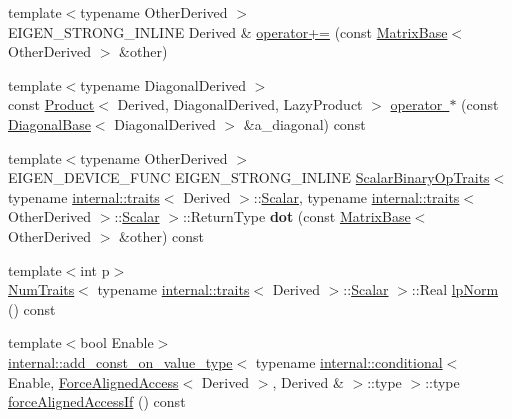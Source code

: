 \begin{DoxyCompactItemize}
\item 
{\footnotesize template$<$typename Other\+Derived $>$ }\\E\+I\+G\+E\+N\+\_\+\+S\+T\+R\+O\+N\+G\+\_\+\+I\+N\+L\+I\+NE Derived \& \mbox{\hyperlink{class_eigen_1_1_matrix_base_a8566b0baaa4cccebbfac4afcc994dc99}{operator+=}} (const \mbox{\hyperlink{class_eigen_1_1_matrix_base}{Matrix\+Base}}$<$ Other\+Derived $>$ \&other)
\item 
{\footnotesize template$<$typename Diagonal\+Derived $>$ }\\const \mbox{\hyperlink{class_eigen_1_1_product}{Product}}$<$ Derived, Diagonal\+Derived, Lazy\+Product $>$ \mbox{\hyperlink{class_eigen_1_1_matrix_base_a0268033122944d28a71ffc9da2a34304}{operator $\ast$}} (const \mbox{\hyperlink{class_eigen_1_1_diagonal_base}{Diagonal\+Base}}$<$ Diagonal\+Derived $>$ \&a\+\_\+diagonal) const
\item 
\mbox{\label{class_eigen_1_1_matrix_base_a30452bde1c49f11e3dfab41d235f1aea}} 
{\footnotesize template$<$typename Other\+Derived $>$ }\\E\+I\+G\+E\+N\+\_\+\+D\+E\+V\+I\+C\+E\+\_\+\+F\+U\+NC E\+I\+G\+E\+N\+\_\+\+S\+T\+R\+O\+N\+G\+\_\+\+I\+N\+L\+I\+NE \mbox{\hyperlink{struct_eigen_1_1_scalar_binary_op_traits}{Scalar\+Binary\+Op\+Traits}}$<$ typename \mbox{\hyperlink{struct_eigen_1_1internal_1_1traits}{internal\+::traits}}$<$ Derived $>$\+::\mbox{\hyperlink{class_eigen_1_1_dense_base_a5feed465b3a8e60c47e73ecce83e39a2}{Scalar}}, typename \mbox{\hyperlink{struct_eigen_1_1internal_1_1traits}{internal\+::traits}}$<$ Other\+Derived $>$\+::\mbox{\hyperlink{class_eigen_1_1_dense_base_a5feed465b3a8e60c47e73ecce83e39a2}{Scalar}} $>$\+::Return\+Type {\bfseries dot} (const \mbox{\hyperlink{class_eigen_1_1_matrix_base}{Matrix\+Base}}$<$ Other\+Derived $>$ \&other) const
\item 
{\footnotesize template$<$int p$>$ }\\\mbox{\hyperlink{struct_eigen_1_1_num_traits}{Num\+Traits}}$<$ typename \mbox{\hyperlink{struct_eigen_1_1internal_1_1traits}{internal\+::traits}}$<$ Derived $>$\+::\mbox{\hyperlink{class_eigen_1_1_dense_base_a5feed465b3a8e60c47e73ecce83e39a2}{Scalar}} $>$\+::Real \mbox{\hyperlink{class_eigen_1_1_matrix_base_ad5a1e4d317c85c0fdc3247b8117a35bf}{lp\+Norm}} () const
\item 
{\footnotesize template$<$bool Enable$>$ }\\\mbox{\hyperlink{struct_eigen_1_1internal_1_1add__const__on__value__type}{internal\+::add\+\_\+const\+\_\+on\+\_\+value\+\_\+type}}$<$ typename \mbox{\hyperlink{struct_eigen_1_1internal_1_1conditional}{internal\+::conditional}}$<$ Enable, \mbox{\hyperlink{class_eigen_1_1_force_aligned_access}{Force\+Aligned\+Access}}$<$ Derived $>$, Derived \& $>$\+::type $>$\+::type \mbox{\hyperlink{class_eigen_1_1_matrix_base_af42d92f115d4b8fa3d5aa731ed496ed1}{force\+Aligned\+Access\+If}} () const

\end{DoxyCompactItemize}
